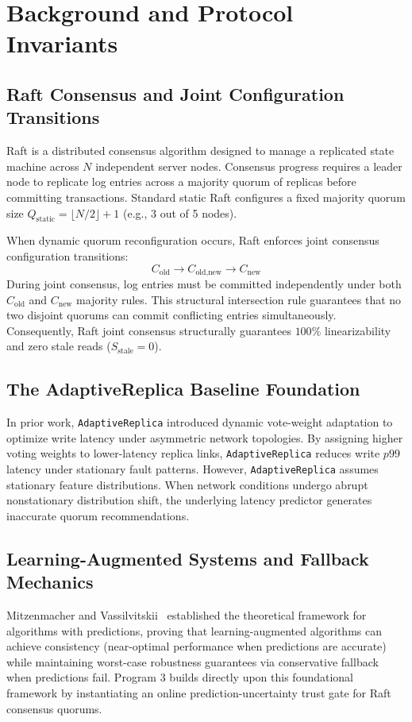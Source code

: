 \section{Background and Protocol Invariants}
\label{sec:background}

\subsection{Raft Consensus and Joint Configuration Transitions}
Raft is a distributed consensus algorithm designed to manage a replicated state machine across $N$ independent server nodes. Consensus progress requires a leader node to replicate log entries across a majority quorum of replicas before committing transactions. Standard static Raft configures a fixed majority quorum size $Q_{\text{static}} = \lfloor N/2 \rfloor + 1$ (e.g., 3 out of 5 nodes).

When dynamic quorum reconfiguration occurs, Raft enforces joint consensus configuration transitions:
\begin{equation}
C_{\text{old}} \longrightarrow C_{\text{old,new}} \longrightarrow C_{\text{new}}
\end{equation}
During joint consensus, log entries must be committed independently under both $C_{\text{old}}$ and $C_{\text{new}}$ majority rules. This structural intersection rule guarantees that no two disjoint quorums can commit conflicting entries simultaneously. Consequently, Raft joint consensus structurally guarantees $100\%$ linearizability and zero stale reads ($S_{\text{stale}}=0$).

\subsection{The AdaptiveReplica Baseline Foundation}
In prior work, \texttt{AdaptiveReplica} introduced dynamic vote-weight adaptation to optimize write latency under asymmetric network topologies. By assigning higher voting weights to lower-latency replica links, \texttt{AdaptiveReplica} reduces write $p99$ latency under stationary fault patterns. However, \texttt{AdaptiveReplica} assumes stationary feature distributions. When network conditions undergo abrupt nonstationary distribution shift, the underlying latency predictor generates inaccurate quorum recommendations.

\subsection{Learning-Augmented Systems and Fallback Mechanics}
Mitzenmacher and Vassilvitskii~\cite{mitzenmacher2022algorithms} established the theoretical framework for algorithms with predictions, proving that learning-augmented algorithms can achieve consistency (near-optimal performance when predictions are accurate) while maintaining worst-case robustness guarantees via conservative fallback when predictions fail. Program 3 builds directly upon this foundational framework by instantiating an online prediction-uncertainty trust gate for Raft consensus quorums.
